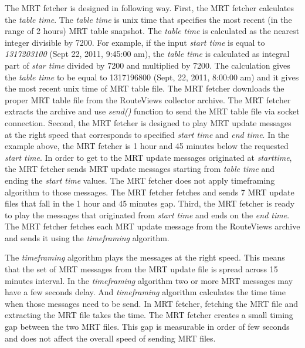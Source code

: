 The MRT fetcher is designed in following way. First,  the MRT fetcher calculates the \emph{table time}. The \emph{table time} is unix time that specifies the most recent (in the range of 2 hours) MRT table snapshot. The \emph{table time}  is calculated as the nearest integer divisible by 7200. For example, if the input \emph{start time} is equal to \emph{1317203100} (Sept 22, 2011, 9:45:00 am), the \emph{table time} is calculated as  integral part of \emph{star time} divided by 7200  and  multiplied by 7200. The calculation gives the \emph{table time} to be equal to 1317196800 (Sept, 22, 2011, 8:00:00 am) and it gives the most recent  unix time of MRT table file. The MRT fetcher downloads  the proper MRT table file from the RouteViews collector archive.   The MRT fetcher extracts the archive and use \emph{send()} function  to  send the MRT table file via socket connection.  Second,  the MRT fetcher is designed to play MRT  update messages at the right speed that corresponds to specified \emph{start time} and \emph{end time}.  In the example above, the MRT fetcher is 1 hour and 45 minutes below the requested \emph{start time}. In order to get to the MRT update messages  originated at \emph{starttime}, the MRT fetcher sends MRT update messages starting from \emph{table time} and ending the \emph{start time} values. The MRT fetcher does not apply timeframing algorithm to those messages. The MRT fetcher fetches and  sends 7 MRT update files that fall in the 1 hour and 45 minutes gap.   Third, the MRT fetcher is ready to play the messages that originated from \emph{start time} and ends on the \emph{end time}. The MRT fetcher fetches each MRT update message from the RouteViews archive and sends it using the \emph{timeframing} algorithm.


The \emph{timeframing} algorithm plays the messages at the right speed. This means that the set of MRT messages from the MRT update file is spread across 15 minutes interval. In the \emph{timeframing}  algorithm two or more MRT messages may have a few seconds delay. And \emph{timeframing} algorithm calculates the time time when those messages need to be send.  In MRT fetcher, fetching the MRT file and extracting the MRT file takes the time. The MRT fetcher creates a small timing gap between the two MRT files. This gap is measurable in order of few seconds and does not affect the overall speed of sending MRT files.    

